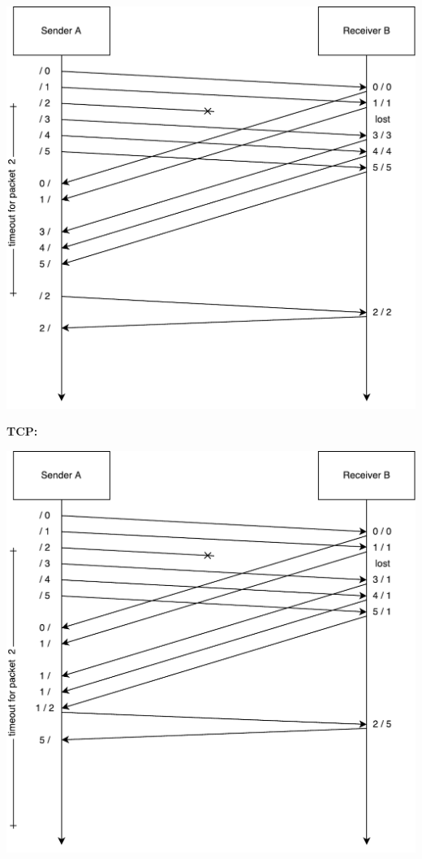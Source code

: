 \documentclass[12pt, a4paper]{article}
\begin{document}
\begin{enumerate}[a]
	\includegraphics[width=\linewidth]{diagrams/SR}

	\clearpage
	\textbf{TCP:}

	\includegraphics[width=\linewidth]{diagrams/TCP}


\end{enumerate}
\end{document}
